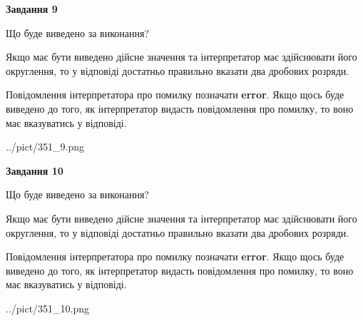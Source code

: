 \documentclass[12pt, ukrainian]{article}
\begin{document}
{\begin {Large}
{\begin {center}\textbf{Завдання 9}\end {center}}\par
Що буде виведено за виконання? \par

Якщо має бути виведено дійсне значення та інтерпретатор має здійснювати його округлення, 
то у відповіді достатньо правильно вказати два дробових розряди.

Повідомлення інтерпретатора про помилку позначати \textbf{error}.
Якщо щось буде виведено до того, як інтерпретатор видасть повідомлення про помилку, 
то воно має вказуватись у відповіді. \par

\begin{center}
	{../pict/351_9.png}
\end{center}
\newpage

{\begin {center}\textbf{Завдання 10}\end {center}}\par
Що буде виведено за виконання? \par

Якщо має бути виведено дійсне значення та інтерпретатор має здійснювати його округлення, 
то у відповіді достатньо правильно вказати два дробових розряди.

Повідомлення інтерпретатора про помилку позначати \textbf{error}.
Якщо щось буде виведено до того, як інтерпретатор видасть повідомлення про помилку, 
то воно має вказуватись у відповіді. \par

\begin{center}
	{../pict/351_10.png}
\end{center}
\newpage

\end {Large}}
\end{document}

